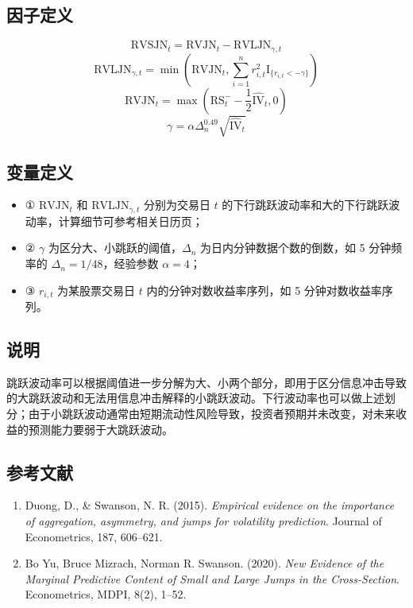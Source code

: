 \documentclass{article}
\begin{document}
\subsection{因子定义}
\begin{equation}
    \mathrm{RVSJN}_t = \mathrm{RVJN}_t - \mathrm{RVLJN}_{\gamma,t}
\end{equation}
\begin{equation}
    \mathrm{RVLJN}_{\gamma,t} = \min\left(\mathrm{RVJN}_t, \sum_{i=1}^n r_{i,t}^2 \mathrm{I}_{\{r_{i,t} < -\gamma\}}\right)
\end{equation}
\begin{equation}
    \mathrm{RVJN}_t = \max\left(\mathrm{RS}_t^- - \frac{1}{2}\hat{\mathrm{IV}}_t, 0\right)
\end{equation}
\begin{equation}
    \gamma = \alpha \Delta_n^{0.49} \sqrt{\hat{\mathrm{IV}}_t}
\end{equation}

\subsection{变量定义}
\begin{itemize}
    \item ① \( \mathrm{RVJN}_t \) 和 \( \mathrm{RVLJN}_{\gamma,t} \) 分别为交易日 \( t \) 的下行跳跃波动率和大的下行跳跃波动率，计算细节可参考相关日历页；
    \item ② \( \gamma \) 为区分大、小跳跃的阈值，\( \Delta_n \) 为日内分钟数据个数的倒数，如 5 分钟频率的 \( \Delta_n = 1/48 \)，经验参数 \( \alpha = 4 \)；
    \item ③ \( r_{i,t} \) 为某股票交易日 \( t \) 内的分钟对数收益率序列，如 5 分钟对数收益率序列。
\end{itemize}

\subsection{说明}
跳跃波动率可以根据阈值进一步分解为大、小两个部分，即用于区分信息冲击导致的大跳跃波动和无法用信息冲击解释的小跳跃波动。下行波动率也可以做上述划分；由于小跳跃波动通常由短期流动性风险导致，投资者预期并未改变，对未来收益的预测能力要弱于大跳跃波动。

\subsection{参考文献}
\begin{enumerate}
    \item Duong, D., \& Swanson, N. R. (2015). \textit{Empirical evidence on the importance of aggregation, asymmetry, and jumps for volatility prediction}. Journal of Econometrics, 187, 606–621.
    \item Bo Yu, Bruce Mizrach, Norman R. Swanson. (2020). \textit{New Evidence of the Marginal Predictive Content of Small and Large Jumps in the Cross-Section}. Econometrics, MDPI, 8(2), 1–52.
\end{enumerate}
\end{document}

